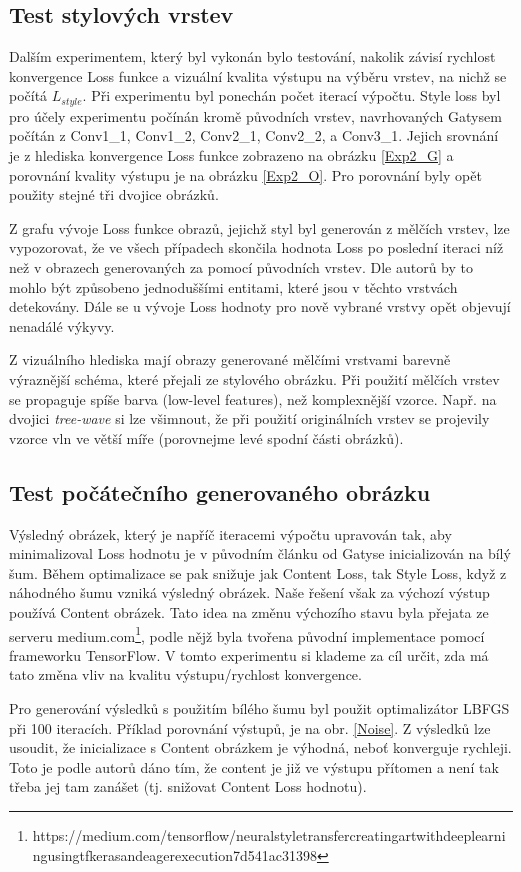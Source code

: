 \documentclass[twocolumn]{article}
\begin{document}
	\subsection*{Test stylových vrstev}
	Dalším experimentem, který byl vykonán bylo testování, nakolik závisí rychlost konvergence Loss funkce a vizuální kvalita výstupu na výběru vrstev, na nichž se počítá $L_{style}$. Při experimentu byl ponechán počet iterací výpočtu. Style loss byl pro účely experimentu počínán kromě původních vrstev, navrhovaných Gatysem počítán z Conv1\_1, Conv1\_2, Conv2\_1, Conv2\_2, a Conv3\_1.
	Jejich srovnání je z hlediska konvergence Loss funkce zobrazeno na obrázku \ref{Exp2_G} a porovnání kvality výstupu je na obrázku \ref{Exp2_O}. Pro porovnání byly opět použity stejné tři dvojice obrázků.
	\par
	Z grafu vývoje Loss funkce obrazů, jejichž styl byl generován z mělčích vrstev, lze vypozorovat, že ve všech případech skončila hodnota Loss po poslední iteraci níž než v obrazech generovaných za pomocí původních vrstev. Dle autorů by to mohlo být způsobeno jednoduššími entitami, které jsou v těchto vrstvách detekovány. Dále se u vývoje Loss hodnoty pro nově vybrané vrstvy opět objevují nenadálé výkyvy. 
	\par
	Z vizuálního hlediska mají obrazy generované mělčími vrstvami barevně výraznější schéma, které přejali ze stylového obrázku. Při použití mělčích vrstev se propaguje spíše barva (low-level features), než komplexnější vzorce. Např. na dvojici \textit{tree-wave} si lze všimnout, že při použití originálních vrstev se projevily vzorce vln ve větší míře (porovnejme levé spodní části obrázků). 
	 
	\subsection*{Test počátečního generovaného obrázku}
	Výsledný obrázek, který je napříč iteracemi výpočtu upravován tak, aby minimalizoval Loss hodnotu je v původním článku od Gatyse inicializován na bílý šum. Během optimalizace se pak snižuje jak Content Loss, tak Style Loss, když z náhodného šumu vzniká výsledný obrázek. Naše řešení však za výchozí výstup používá Content obrázek. Tato idea na změnu výchozího stavu byla přejata ze serveru medium.com\footnote{https://medium.com/tensorflow/neural\-style\-transfer\-creating\-art\-with\-deep\-learning\-using\-tf\-keras\-and\-eager\-execution\-7d541ac31398}, podle nějž byla tvořena původní implementace pomocí frameworku TensorFlow. V tomto experimentu si klademe za cíl určit, zda má tato změna vliv na kvalitu výstupu/rychlost konvergence.
	\par
	Pro generování výsledků s použitím bílého šumu byl použit optimalizátor LBFGS při 100 iteracích. Příklad porovnání výstupů, je na obr. \ref{Noise}. Z výsledků lze usoudit, že inicializace s Content obrázkem je výhodná, neboť konverguje rychleji. Toto je podle autorů dáno tím, že content je již ve výstupu přítomen a není tak třeba jej tam zanášet (tj. snižovat Content Loss hodnotu).
	
\end{document}
